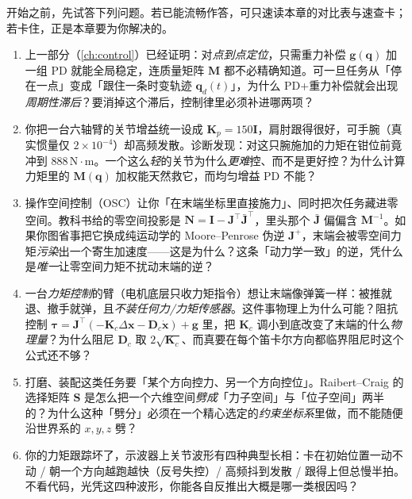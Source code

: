 \begin{practice}[前置自测]
开始之前，先试答下列问题。若已能流畅作答，可只速读本章的对比表与速查卡；若卡住，正是本章要为你解决的。
\begin{enumerate}
  \item 上一部分（\cref{ch:control}）已经证明：对\emph{点到点定位}，只需重力补偿 $\mathbf{g}(\mathbf{q})$ 加一组 PD 就能全局稳定，连质量矩阵 $\mathbf{M}$ 都不必精确知道。可一旦任务从「停在一点」变成「跟住一条时变轨迹 $\mathbf{q}_d(t)$」，为什么 PD+重力补偿就会出现\emph{周期性滞后}？要消掉这个滞后，控制律里必须补进哪两项？
  \item 你把一台六轴臂的关节增益统一设成 $\mathbf{K}_p=150\mathbf{I}$，肩肘跟得很好，可手腕（真实惯量仅 $2\times10^{-4}$）却高频发散。诊断发现：对这只腕施加的力矩在钳位前竟冲到 $888\,\mathrm{N\!\cdot\!m}$。一个这么\emph{轻}的关节为什么\emph{更难}控、而不是更好控？为什么计算力矩里的 $\mathbf{M}(\mathbf{q})$ 加权能天然救它，而均匀增益 PD 不能？
  \item 操作空间控制（OSC）让你「在末端坐标里直接施力」、同时把次任务藏进零空间。教科书给的零空间投影是 $\mathbf{N}=\mathbf{I}-\mathbf{J}^\top\bar{\mathbf{J}}^\top$，里头那个 $\bar{\mathbf{J}}$ 偏偏含 $\mathbf{M}^{-1}$。如果你图省事把它换成纯运动学的 Moore--Penrose 伪逆 $\mathbf{J}^+$，末端会被零空间力矩\emph{污染}出一个寄生加速度——这是为什么？这条「动力学一致」的逆，凭什么是\emph{唯一}让零空间力矩不扰动末端的逆？
  \item 一台\emph{力矩控制}的臂（电机底层只收力矩指令）想让末端像弹簧一样：被推就退、撤手就弹，且\emph{不装任何力/力矩传感器}。这件事物理上为什么可能？阻抗控制 $\boldsymbol{\tau}=\mathbf{J}^\top(-\mathbf{K}_c\Delta\mathbf{x}-\mathbf{D}_c\dot{\mathbf{x}})+\mathbf{g}$ 里，把 $\mathbf{K}_c$ 调小到底改变了末端的什么\emph{物理量}？为什么阻尼 $\mathbf{D}_c$ 取 $2\sqrt{\mathbf{K}_c}$、而真要在每个笛卡尔方向都临界阻尼时这个公式还不够？
  \item 打磨、装配这类任务要「某个方向控力、另一个方向控位」。Raibert--Craig 的选择矩阵 $\mathbf{S}$ 是怎么把一个六维空间\emph{劈成}「力子空间」与「位子空间」两半的？为什么这种「劈分」必须在一个精心选定的\emph{约束坐标系}里做，而不能随便沿世界系的 $x,y,z$ 劈？
  \item 你的力矩跟踪坏了，示波器上关节波形有四种典型长相：卡在初始位置一动不动 / 朝一个方向越跑越快（反号失控）/ 高频抖到发散 / 跟得上但总慢半拍。不看代码，光凭这四种波形，你能各自反推出大概是哪一类根因吗？
\end{enumerate}
\end{practice}


